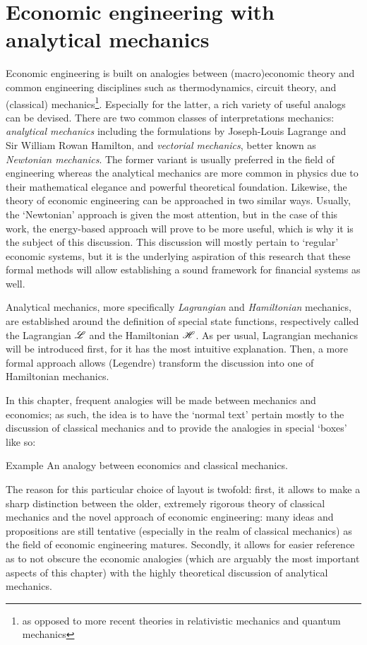 \chapter{Economic engineering with analytical mechanics}
\label{chap:ee}
Economic engineering is built on analogies between (macro)economic theory and common engineering disciplines such as thermodynamics, circuit theory, and (classical) mechanics\footnote{as opposed to more recent theories in relativistic mechanics and quantum mechanics}. Especially for the latter, a rich variety of useful analogs can be devised. There are two common classes of interpretations mechanics: \emph{analytical mechanics} including the formulations by Joseph-Louis Lagrange and Sir William Rowan Hamilton, and \emph{vectorial mechanics}, better known as \emph{Newtonian mechanics}. The former variant is usually preferred in the field of engineering whereas the analytical mechanics are more common in physics due to their mathematical elegance and powerful theoretical foundation. Likewise, the theory of economic engineering can be approached in two similar ways. Usually, the `Newtonian' approach is given the most attention, but in the case of this work, the energy-based approach will prove to be more useful, which is why it is the subject of this discussion. This discussion will mostly pertain to `regular' economic systems, but it is the underlying aspiration of this research that these formal methods will allow establishing a sound framework for financial systems as well.

Analytical mechanics, more specifically \emph{Lagrangian} and \emph{Hamiltonian} mechanics, are established around the definition of special state functions, respectively called the Lagrangian \(\mathscr{L}\) and the Hamiltonian \(\mathscr{H}\). As per usual, Lagrangian mechanics will be introduced first, for it has the most intuitive explanation. Then, a more formal approach allows (Legendre) transform the discussion into one of Hamiltonian mechanics. 

In this chapter, frequent analogies will be made between mechanics and economics; as such, the idea is to have the `normal text' pertain mostly to the discussion of classical mechanics and to provide the analogies in special `boxes' like so:
\begin{econ}{Example}
    An analogy between economics and classical mechanics.
\end{econ}
The reason for this particular choice of layout is twofold: first, it allows to make a sharp distinction between the older, extremely rigorous theory of classical mechanics and the novel approach of economic engineering: many ideas and propositions are still tentative (especially in the realm of classical mechanics) as the field of economic engineering matures. Secondly, it allows for easier reference as to not obscure the economic analogies (which are arguably the most important aspects of this chapter) with the highly theoretical discussion of analytical mechanics.
